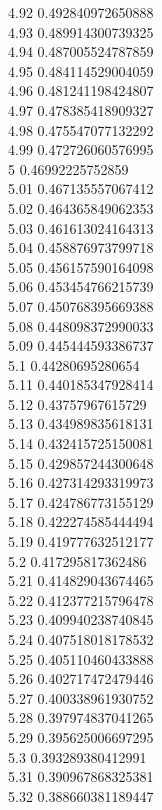 {4.92	0.492840972650888\\
4.93	0.489914300739325\\
4.94	0.487005524787859\\
4.95	0.484114529004059\\
4.96	0.481241198424807\\
4.97	0.478385418909327\\
4.98	0.475547077132292\\
4.99	0.472726060576995\\
5	0.46992225752859\\
5.01	0.467135557067412\\
5.02	0.464365849062353\\
5.03	0.461613024164313\\
5.04	0.458876973799718\\
5.05	0.456157590164098\\
5.06	0.453454766215739\\
5.07	0.450768395669388\\
5.08	0.448098372990033\\
5.09	0.445444593386737\\
5.1	0.44280695280654\\
5.11	0.440185347928414\\
5.12	0.43757967615729\\
5.13	0.434989835618131\\
5.14	0.432415725150081\\
5.15	0.429857244300648\\
5.16	0.427314293319973\\
5.17	0.424786773155129\\
5.18	0.422274585444494\\
5.19	0.419777632512177\\
5.2	0.417295817362486\\
5.21	0.414829043674465\\
5.22	0.412377215796478\\
5.23	0.409940238740845\\
5.24	0.407518018178532\\
5.25	0.405110460433888\\
5.26	0.402717472479446\\
5.27	0.400338961930752\\
5.28	0.397974837041265\\
5.29	0.395625006697295\\
5.3	0.393289380412991\\
5.31	0.390967868325381\\
5.32	0.388660381189447\\
}
